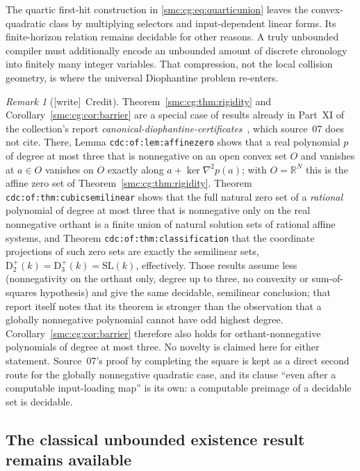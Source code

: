 \documentclass[11pt,letterpaper]{article}
\numberwithin{equation}{section}
\theoremstyle{definition}
\theoremstyle{remark}
\newtheorem{remark}[theorem]{Remark}
\newcommand{\R}{\mathbb R}
\newcommand{\wtag}{\textup{[write]}}
\begin{document}
The quartic first-hit construction in \eqref{smc:cg:eq:quarticunion} leaves the
convex-quadratic class by multiplying selectors and input-dependent linear
forms. Its finite-horizon relation remains decidable for other reasons.
A truly unbounded compiler must additionally encode an unbounded amount of
discrete chronology into finitely many integer variables. That compression,
not the local collision geometry, is where the universal Diophantine
problem re-enters.

\begin{remark}[\wtag\ Credit]\label{smc:cg:rem:credit}
Theorem~\ref{smc:cg:thm:rigidity} and Corollary~\ref{smc:cg:cor:barrier} are a special case of results already in Part~XI of the collection's report \emph{canonical-diophantine-certificates}~\cite{cdc}, which source~07 does not cite. There, Lemma \texttt{cdc:of:lem:affinezero} shows that a real polynomial $p$ of degree at most three that is nonnegative on an open convex set $O$ and vanishes at $a\in O$ vanishes on $O$ exactly along $a+\ker\nabla^2p(a)$; with $O=\R^N$ this is the affine zero set of Theorem~\ref{smc:cg:thm:rigidity}. Theorem \texttt{cdc:of:thm:cubicsemilinear} shows that the full natural zero set of a \emph{rational} polynomial of degree at most three that is nonnegative only on the real nonnegative orthant is a finite union of natural solution sets of rational affine systems, and Theorem \texttt{cdc:of:thm:classification} that the coordinate projections of such zero sets are exactly the semilinear sets, $\mathrm D^+_2(k)=\mathrm D^+_3(k)=\mathrm{SL}(k)$, effectively. Those results assume less (nonnegativity on the orthant only, degree up to three, no convexity or sum-of-squares hypothesis) and give the same decidable, semilinear conclusion; that report itself notes that its theorem is stronger than the observation that a globally nonnegative polynomial cannot have odd highest degree. Corollary~\ref{smc:cg:cor:barrier} therefore also holds for orthant-nonnegative polynomials of degree at most three. No novelty is claimed here for either statement. Source~07's proof by completing the square is kept as a direct second route for the globally nonnegative quadratic case, and its clause ``even after a computable input-loading map'' is its own: a computable preimage of a decidable set is decidable.
\end{remark}

\subsection{The classical unbounded existence result remains available}
\end{document}
